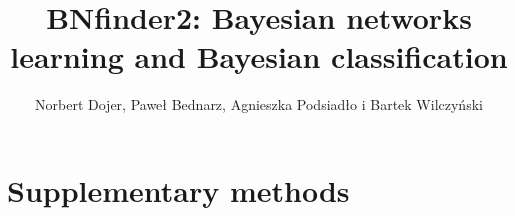 \documentclass{article}
\title{BNfinder2: Bayesian networks learning and Bayesian classification }
\author{ Norbert Dojer, Paweł Bednarz, Agnieszka Podsiadło i Bartek Wilczyński}
\begin{document}
\maketitle
\tableofcontents

\section{Supplementary methods}




\end{document}
